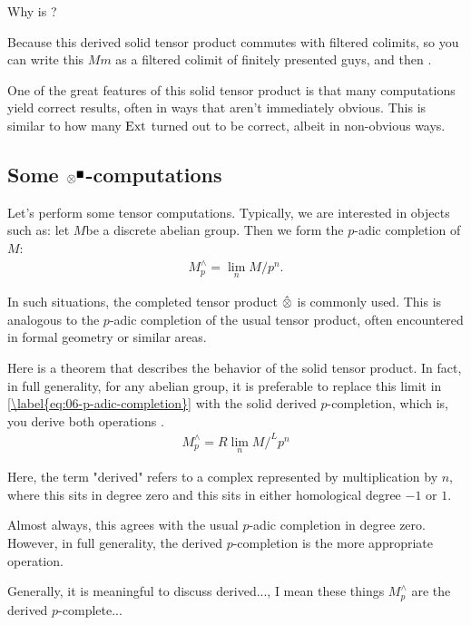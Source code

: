 \ques Why is ?

\ans Because this derived solid tensor product commutes with filtered colimits, so you can write this $Mm$ as a filtered colimit of finitely presented guys, and then .

One of the great features of this solid tensor product is that many computations yield correct results, often in ways that aren't immediately obvious. This is similar to how many $\operatorname{Ext}$ turned out to be correct, albeit in non-obvious ways.

\subsection{Some $\otimes^\blacksquare$-computations}

Let's perform some tensor computations. Typically, we are interested in objects such as: let $M$be a discrete abelian group. Then we form the $p$-adic completion of $M$:
\begin{align*} \label{eq:06-p-adic-completion}
M_p^\wedge = \lim_n M / p^n.
\end{align*}

In such situations, the completed tensor product $\hat{\otimes}$ is commonly used. This is analogous to the $p$-adic completion of the usual tensor product, often encountered in formal geometry or similar areas.

Here is a theorem that describes the behavior of the solid tensor product. In fact, in full generality, for any abelian group, it is preferable to replace this limit in \ref{\label{eq:06-p-adic-completion}} with the solid derived $p$-completion, which is, you derive both operations .
\begin{align*} \label{eq:06-p-adic-completion}
M_p^\wedge = R\lim_n M /^L p^n
\end{align*}

Here, the term "derived" refers to a complex represented by multiplication by $n$, where this sits in degree zero and this sits in either homological degree $-1$ or $1$. 

Almost always, this agrees with the usual $p$-adic completion in degree zero. However, in full generality, the derived $p$-completion is the more appropriate operation.

Generally, it is meaningful to discuss derived..., I mean these things $M_p^\wedge$ are the derived $p$-complete...

